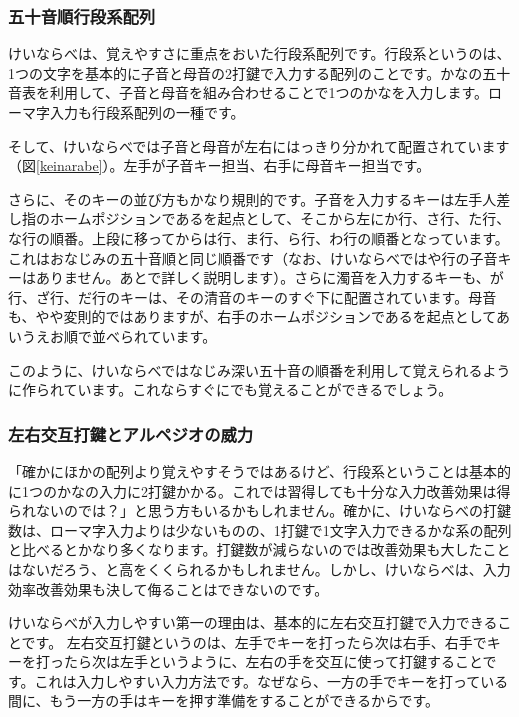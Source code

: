 \subsubsection*{五十音順行段系配列}

けいならべは、覚えやすさに重点をおいた行段系配列です。行段系というのは、1つの文字を基本的に子音と母音の2打鍵で入力する配列のことです。かなの五十音表を利用して、子音と母音を組み合わせることで1つのかなを入力します。ローマ字入力も行段系配列の一種です。

そして、けいならべでは子音と母音が左右にはっきり分かれて配置されています（図\ref{keinarabe}）。左手が子音キー担当、右手に母音キー担当です。

さらに、そのキーの並び方もかなり規則的です。子音を入力するキーは左手人差し指のホームポジションであるを起点として、そこから左にか行、さ行、た行、な行の順番。上段に移ってからは行、ま行、ら行、わ行の順番となっています。これはおなじみの五十音順と同じ順番です（なお、けいならべではや行の子音キーはありません。あとで詳しく説明します）。さらに濁音を入力するキーも、が行、ざ行、だ行のキーは、その清音のキーのすぐ下に配置されています。母音も、やや変則的ではありますが、右手のホームポジションであるを起点としてあいうえお順で並べられています。

このように、けいならべではなじみ深い五十音の順番を利用して覚えられるように作られています。これならすぐにでも覚えることができるでしょう。

\subsubsection*{左右交互打鍵とアルペジオの威力}

「確かにほかの配列より覚えやすそうではあるけど、行段系ということは基本的に1つのかなの入力に2打鍵かかる。これでは習得しても十分な入力改善効果は得られないのでは？」と思う方もいるかもしれません。確かに、けいならべの打鍵数は、ローマ字入力よりは少ないものの、1打鍵で1文字入力できるかな系の配列と比べるとかなり多くなります。打鍵数が減らないのでは改善効果も大したことはないだろう、と高をくくられるかもしれません。しかし、けいならべは、入力効率改善効果も決して侮ることはできないのです。

けいならべが入力しやすい第一の理由は、基本的に左右交互打鍵で入力できることです。
左右交互打鍵というのは、左手でキーを打ったら次は右手、右手でキーを打ったら次は左手というように、左右の手を交互に使って打鍵することです。これは入力しやすい入力方法です。なぜなら、一方の手でキーを打っている間に、もう一方の手はキーを押す準備をすることができるからです。

